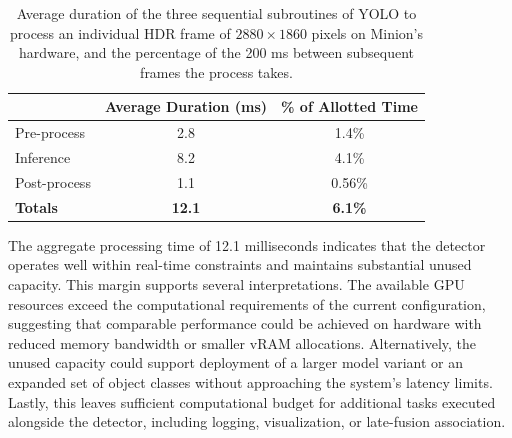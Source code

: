 \documentclass{erauthesis}
\begin{document}
\begin{table}[ht]
    \centering
    \begin{tabular}{lcc}
        \hline
        & Average Duration (ms) & \% of Allotted Time \\
        \hline
        Pre-process   & 2.8  & 1.4\%  \\
        Inference     & 8.2  & 4.1\%  \\
        Post-process  & 1.1  & 0.56\% \\
        \hline
        \textbf{Totals} & \textbf{12.1} & \textbf{6.1\%} \\
        \hline
    \end{tabular}
        \caption{Average duration of the three sequential subroutines of YOLO to process an individual HDR frame of $2880 \times 1860$ pixels on Minion's hardware, and the percentage of the 200 ms between subsequent frames the process takes.}
    \label{tab:yolo_performance}
\end{table}

The aggregate processing time of 12.1 milliseconds indicates that the detector operates well within real-time constraints and maintains substantial unused capacity. 
This margin supports several interpretations. The available GPU resources exceed the computational requirements of the current configuration, suggesting that comparable performance could be achieved on hardware with reduced memory bandwidth or smaller \ac{vRAM} allocations. 
Alternatively, the unused capacity could support deployment of a larger model variant or an expanded set of object classes without approaching the system’s latency limits.
Lastly, this leaves sufficient computational budget for additional tasks executed alongside the detector, including logging, visualization, or late-fusion association.



\end{document}
